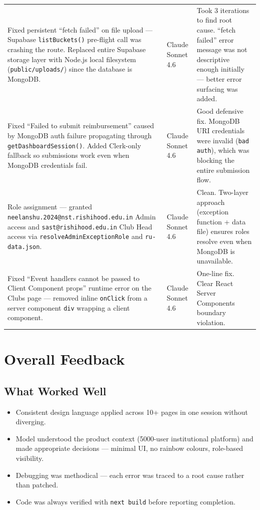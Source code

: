 \documentclass[11pt, a4paper]{article}
\begin{document}
\begin{longtable}{>{\raggedright\arraybackslash}p{7.5cm} >{\centering\arraybackslash}p{3cm} >{\raggedright\arraybackslash}p{4.5cm}}
Fixed persistent ``fetch failed'' on file upload — Supabase \texttt{listBuckets()} pre-flight call was crashing the route. Replaced entire Supabase storage layer with Node.js local filesystem (\texttt{public/uploads/}) since the database is MongoDB.
& Claude Sonnet 4.6
& Took 3 iterations to find root cause. ``fetch failed'' error message was not descriptive enough initially — better error surfacing was added. \\

Fixed ``Failed to submit reimbursement'' caused by MongoDB auth failure propagating through \texttt{getDashboardSession()}. Added Clerk-only fallback so submissions work even when MongoDB credentials fail.
& Claude Sonnet 4.6
& Good defensive fix. MongoDB URI credentials were invalid (\texttt{bad auth}), which was blocking the entire submission flow. \\

Role assignment — granted \texttt{neelanshu.2024@nst.rishihood.edu.in} Admin access and \texttt{sast@rishihood.edu.in} Club Head access via \texttt{resolveAdminExceptionRole} and \texttt{ru-data.json}.
& Claude Sonnet 4.6
& Clean. Two-layer approach (exception function + data file) ensures roles resolve even when MongoDB is unavailable. \\

Fixed ``Event handlers cannot be passed to Client Component props'' runtime error on the Clubs page — removed inline \texttt{onClick} from a server component \texttt{div} wrapping a client component.
& Claude Sonnet 4.6
& One-line fix. Clear React Server Components boundary violation. \\

\end{longtable}

\section{Overall Feedback}

\subsection{What Worked Well}
\begin{itemize}
    \item Consistent design language applied across 10+ pages in one session without diverging.
    \item Model understood the product context (5000-user institutional platform) and made
          appropriate decisions — minimal UI, no rainbow colours, role-based visibility.
    \item Debugging was methodical — each error was traced to a root cause rather than patched.
    \item Code was always verified with \texttt{next build} before reporting completion.
\end{itemize}
\end{document}
